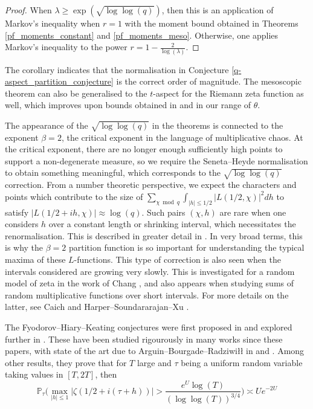 \documentclass[reqno]{amsart}
\theoremstyle{definition}
\theoremstyle{remark}
\numberwithin{equation}{section}
\theoremstyle{remark}
\begin{document}
\begin{proof}
    When $\lambda \geq \exp(\sqrt{\log\log(q)})$, then this is an application of Markov's inequality when $r=1$ with the moment bound obtained in Theorems \ref{pf_moments_constant} and \ref{pf_moments_meso}. Otherwise, one applies Markov's inequality to the power $r=1-\frac{2}{\log(\lambda)}$.
\end{proof}
The corollary indicates that the normalisation in Conjecture \ref{q-aspect_partition_conjecture} is the correct order of magnitude. The mesoscopic theorem can also be generalised to the $t$-aspect for the Riemann zeta function as well, which improves upon bounds obtained in \cite{aor21} and \cite{ah24} in our range of $\theta$. \par
The appearance of the $\sqrt{\log\log(q)}$ in the theorems is connected to the exponent $\beta=2$, the critical exponent in the language of multiplicative chaos. At the critical exponent, there are no longer enough sufficiently high points to support a non-degenerate measure, so we require the Seneta--Heyde normalisation to obtain something meaningful, which corresponds to the $\sqrt{\log\log(q)}$ correction. From a number theoretic perspective, we expect the characters and points which contribute to the size of $\sum_{\chi \bmod{q}}\int_{|h| \leq 1/2}|L(1/2,\chi)|^2dh$ to satisfy $|L(1/2+ih,\chi)| \approx \log(q)$. Such pairs $(\chi,h)$ are rare when one considers $h$ over a constant length or shrinking interval, which necessitates the renormalisation. This is described in greater detail in \cite{sound09}. In very broad terms, this is why the $\beta=2$ partition function is so important for understanding the typical maxima of these $L$-functions. This type of correction is also seen when the intervals considered are growing very slowly. This is investigated for a random model of zeta in the work of Chang \cite{chang2024}, and also appears when studying sums of random multiplicative functions over short intervals. For more details on the latter, see Caich \cite{c24} and Harper--Soundararajan--Xu \cite{hsx26}. \par
The Fyodorov--Hiary--Keating conjectures were first proposed in \cite{fhk12} and explored further in \cite{fk14}. These have been studied rigourously in many works since these papers, with state of the art due to Arguin--Bourgade--Radziwi\l{}\l{} in \cite{abr20} and \cite{abr23}. Among other results, they prove that for $T$ large and $\tau$ being a uniform random variable taking values in $[T,2T]$, then
$$\mathbb{P}_\tau\big(\max_{|h| \leq 1}|\zeta(1/2+i(\tau+h))| > \frac{e^U\log(T)}{(\log\log(T))^{3/4}}\big) \asymp Ue^{-2U}$$
\end{document}
